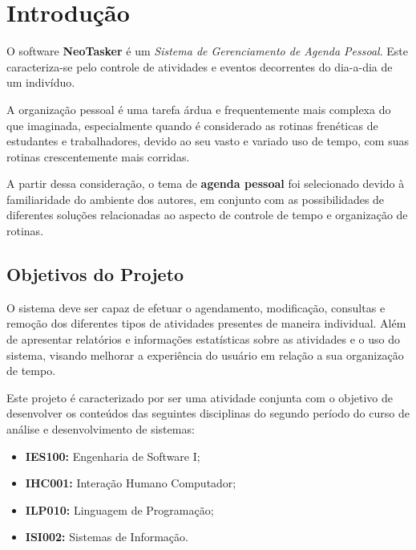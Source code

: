 \documentclass[a4paper,12pt]{article}
\begin{document}
\setcounter{tocdepth}{4}
\tableofcontents
\pagebreak

\listoffigures
\pagebreak

\section{Introdução}
O software \textbf{NeoTasker} é um \textit{Sistema de Gerenciamento de Agenda Pessoal}. Este caracteriza-se pelo controle de atividades 
e eventos decorrentes do dia-a-dia de um indivíduo.

A organização pessoal é uma tarefa árdua e frequentemente mais complexa do que imaginada, especialmente quando é considerado as rotinas 
frenéticas de estudantes e trabalhadores, devido ao seu vasto e variado uso de tempo, com suas rotinas crescentemente mais corridas.

A partir dessa consideração, o tema de \textbf{agenda pessoal} foi selecionado devido à familiaridade do ambiente dos autores, em 
conjunto com as possibilidades de diferentes soluções relacionadas ao aspecto de controle de tempo e organização de rotinas.

\subsection{Objetivos do Projeto}
O sistema deve ser capaz de efetuar o agendamento, modificação, consultas e remoção dos diferentes tipos de atividades presentes 
de maneira individual. Além de apresentar relatórios e informações estatísticas sobre as atividades e o uso do sistema, visando 
melhorar a experiência do usuário em relação a sua organização de tempo.

Este projeto é caracterizado por ser uma atividade conjunta com o objetivo de desenvolver os conteúdos das seguintes 
disciplinas do segundo período do curso de análise e desenvolvimento de sistemas:
\begin{itemize}
    \item \textbf{IES100:} Engenharia de Software I;
    \item \textbf{IHC001:} Interação Humano Computador;
    \item \textbf{ILP010:} Linguagem de Programação;
    \item \textbf{ISI002:} Sistemas de Informação.
\end{itemize}
\end{document}
